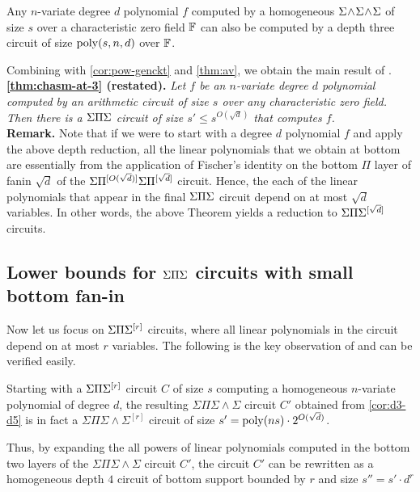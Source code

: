 \begin{lemma}
Any $n$-variate degree $d$ polynomial $f$ computed by a homogeneous $\Sigma\!\wedge\!\Sigma\!\wedge\!\Sigma$ of size $s$ over a characteristic zero field $\mathbb{F}$ can also be computed by a depth three circuit of size $\mathrm{poly}(s,n,d)$ over $\mathbb{F}$. 
\end{lemma}

Combining with \autoref{cor:pow-genckt} and \autoref{thm:av}, we obtain the main result of \cite{gkks13b}. \\

{\bf \autoref{thm:chasm-at-3} (restated). }{\em 
Let $f$ be an $n$-variate degree $d$ polynomial computed by an arithmetic circuit of size $s$ over any characteristic zero field. Then there is a $\Sigma\Pi\Sigma$ circuit of size $s' \leq s^{O(\sqrt{d})}$ that computes $f$. 
}\\

{\bf Remark. } Note that if we were to start with a degree $d$ polynomial $f$ and apply the above depth reduction, all the linear polynomials that we obtain at bottom are essentially from the application of Fischer's identity on the bottom $\Pi$ layer of fanin $\sqrt{d}$ of the $\Sigma\Pi^{[O(\sqrt{d})]}\Sigma\Pi^{[\sqrt{d}]}$ circuit. Hence, the each of the linear polynomials that appear in the final $\Sigma\Pi\Sigma$ circuit depend on at most $\sqrt{d}$ variables. In other words, the above Theorem yields a reduction to $\Sigma\Pi\Sigma^{[\sqrt{d}]}$ circuits. 

\subsection{Lower bounds for $\Sigma\Pi\Sigma$ circuits with small bottom fan-in}

Now let us focus on $\Sigma\Pi\Sigma^{[r]}$ circuits, where all linear polynomials in the circuit depend on at most $r$ variables. The following is the key observation of \cite{KayalSaha14} and can be verified easily. 

\begin{observation}
Starting with a $\Sigma\Pi\Sigma^{[r]}$ circuit $C$ of size $s$ computing a homogeneous $n$-variate polynomial of degree $d$, the resulting $\Sigma\Pi\Sigma\!\wedge\!\Sigma$ circuit $C'$ obtained from \autoref{cor:d3-d5} is in fact a 
$\Sigma\Pi\Sigma\!\wedge\!\Sigma^{[r]}$ circuit of size $s' = \mathrm{poly}(ns) \cdot 2^{O(\sqrt{d})}$. 

Thus, by expanding the all powers of linear polynomials computed in the bottom two layers of the $\Sigma\Pi\Sigma\!\wedge\!\Sigma$ circuit $C'$, the circuit $C'$ can be rewritten as a homogeneous depth $4$ circuit of bottom support bounded by $r$ and  size $s'' = s' \cdot d^r$
\end{observation}

